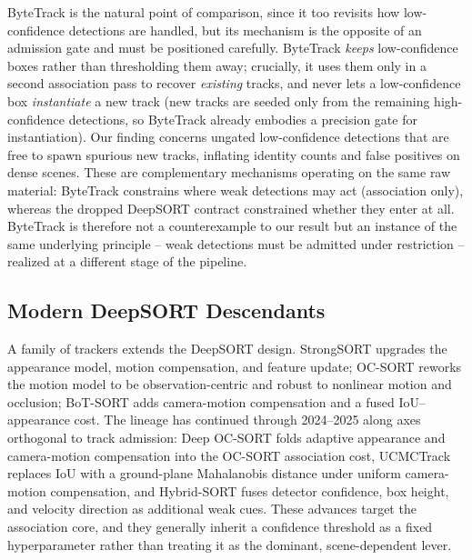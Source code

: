 ByteTrack \cite{zhang2022bytetrack} is the natural point of comparison, since it too revisits how low-confidence detections are handled, but its mechanism is the opposite of an admission gate and must be positioned carefully. ByteTrack \emph{keeps} low-confidence boxes rather than thresholding them away; crucially, it uses them only in a second association pass to recover \emph{existing} tracks, and never lets a low-confidence box \emph{instantiate} a new track (new tracks are seeded only from the remaining high-confidence detections, so ByteTrack already embodies a precision gate for instantiation). Our finding concerns ungated low-confidence detections that are free to spawn spurious new tracks, inflating identity counts and false positives on dense scenes. These are complementary mechanisms operating on the same raw material: ByteTrack constrains where weak detections may act (association only), whereas the dropped DeepSORT contract constrained whether they enter at all. ByteTrack is therefore not a counterexample to our result but an instance of the same underlying principle -- weak detections must be admitted under restriction -- realized at a different stage of the pipeline.

\subsection{Modern DeepSORT Descendants}

A family of trackers extends the DeepSORT design. StrongSORT \cite{du2023strongsort} upgrades the appearance model, motion compensation, and feature update; OC-SORT \cite{cao2023ocsort} reworks the motion model to be observation-centric and robust to nonlinear motion and occlusion; BoT-SORT \cite{aharon2022botsort} adds camera-motion compensation and a fused IoU--appearance cost. The lineage has continued through 2024--2025 along axes orthogonal to track admission: Deep OC-SORT \cite{maggiolino2023deepocsort} folds adaptive appearance and camera-motion compensation into the OC-SORT association cost, UCMCTrack \cite{yi2024ucmctrack} replaces IoU with a ground-plane Mahalanobis distance under uniform camera-motion compensation, and Hybrid-SORT \cite{yang2024hybridsort} fuses detector confidence, box height, and velocity direction as additional weak cues. These advances target the association core, and they generally inherit a confidence threshold as a fixed hyperparameter rather than treating it as the dominant, scene-dependent lever.

